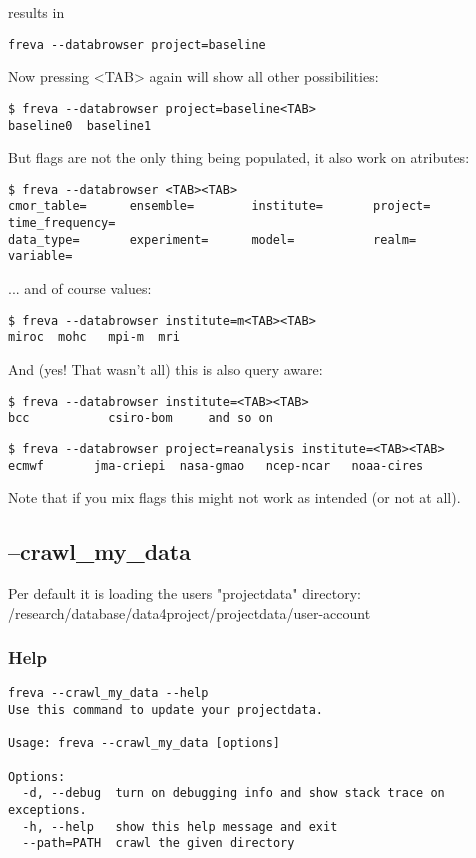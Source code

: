 \documentclass[a4paper,11pt]{ltxdoc}
\begin{document}
results in
\begin{lstlisting}
freva --databrowser project=baseline
\end{lstlisting}

Now pressing <TAB> again will show all other possibilities:
\begin{lstlisting}
$ freva --databrowser project=baseline<TAB>
baseline0  baseline1
\end{lstlisting}
But flags are not the only thing being populated, it also work on atributes:
\begin{lstlisting}
$ freva --databrowser <TAB><TAB>
cmor_table=      ensemble=        institute=       project=         time_frequency=
data_type=       experiment=      model=           realm=           variable=
\end{lstlisting}
... and of course values:
\begin{lstlisting}
$ freva --databrowser institute=m<TAB><TAB>
miroc  mohc   mpi-m  mri
\end{lstlisting}
And (yes! That wasn't all) this is also query aware:
\begin{lstlisting}
$ freva --databrowser institute=<TAB><TAB>
bcc           csiro-bom     and so on    \end{lstlisting}
\begin{lstlisting}
$ freva --databrowser project=reanalysis institute=<TAB><TAB>
ecmwf       jma-criepi  nasa-gmao   ncep-ncar   noaa-cires 
\end{lstlisting}
Note that if you mix flags this might not work as intended (or not at all).

\subsection{--crawl\_my\_data}

Per default it is loading the users "projectdata" directory: \\
/research/database/data4project/projectdata/user-account

\subsubsection*{Help}
\begin{lstlisting}
freva --crawl_my_data --help
Use this command to update your projectdata.

Usage: freva --crawl_my_data [options]

Options:
  -d, --debug  turn on debugging info and show stack trace on exceptions.
  -h, --help   show this help message and exit
  --path=PATH  crawl the given directory
\end{lstlisting}
\end{document}
